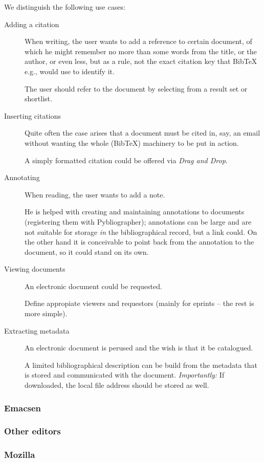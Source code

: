 We distinguish the following use cases:
\begin{description}
\item[Adding a citation] When writing, the user wants to add a
  reference to certain document, of which he might remember no more
  than some words from the title, or the author, or even less, but
  as a rule, not the exact citation key that Bib\TeX\,e.g., would use
  to identify it.

  The user should refer to the document by selecting from a result set
  or shortlist. 
\item[Inserting citations] Quite often the case arises that a document
  must be cited in, say, an email without wanting the whole (Bib\TeX)
  machinery  to be put in action. 
  
  A simply formatted citation could be offered via \textit{Drag and
  Drop}.
\item[Annotating] When reading, the user wants to add a note. 
  
  He is helped with creating and maintaining annotations to documents
  (registering them with Pybliographer); annotations can be large and
  are not suitable for storage \textit{in} the bibliographical record,
  but a link could. On the other hand it is conceivable to point back
  from the annotation to the document, so it could stand on its own.
\item[Viewing documents] An electronic document could be requested.

  Define appropiate viewers and requestors (mainly for eprints -- the
  rest is more simple).
\item[Extracting metadata]  An electronic document is perused and the
  wish is that it be catalogued.
  
  A limited bibliographical description can be build from the metadata
  that is stored and communicated with the document.
  \textit{Importantly:} If downloaded, the local file address should
  be stored as well.
\end{description}
\subsubsection{Emacsen}


\subsubsection{Other editors}


\subsubsection{Mozilla}


